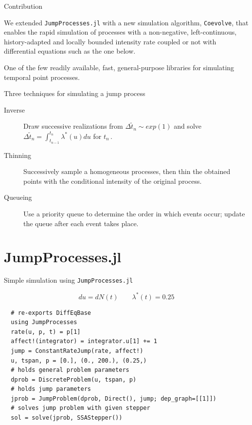 \documentclass[
  ignorenonframetext,
  aspectratio=169,
  xcolor={dvipsnames,rgb}
]{beamer}
\begin{document}
\begin{frame}{Contribution}


\vspace{-3em}

We extended \texttt{JumpProcesses.jl} with a new simulation algorithm, \texttt{Coevolve}, that enables the rapid simulation of processes with a non-negative, left-continuous, history-adapted and locally bounded intensity rate coupled or not with differential equations such as the one below.

\vspace{5em}

One of the few readily available, fast, general-purpose libraries for simulating temporal point processes.

\end{frame}

\begin{frame}{Three techniques for simulating a jump process}

\begin{description}

  \item[Inverse] Draw successive realizations from \( \Delta \tilde{t}_n \sim exp(1) \) and solve \( \Delta \tilde{t}_n = \int_{t_{n-1}}^{t_n} \lambda^\ast (u) du \) for \( t_n \, \).

  \item[Thinning] Successively sample a homogeneous processes, then thin the obtained points with the conditional intensity of the original process.

  \item[Queueing] Use a priority queue to determine the order in which events occur; update the queue after each event takes place.

\end{description}

\end{frame}

\hypertarget{jumpprocesses.jl}{\section{JumpProcesses.jl}\label{jumpprocesses.jl}}

\begin{frame}[fragile=singleslide]{Simple simulation using \texttt{JumpProcesses.jl}}

\[
  du = d N(t) \qquad \lambda^\ast (t) = 0.25
\]


\begin{lstlisting}
  # re-exports DiffEqBase
  using JumpProcesses
  rate(u, p, t) = p[1]
  affect!(integrator) = integrator.u[1] += 1
  jump = ConstantRateJump(rate, affect!)
  u, tspan, p = [0.], (0., 200.), (0.25,)
  # holds general problem parameters
  dprob = DiscreteProblem(u, tspan, p)
  # holds jump parameters
  jprob = JumpProblem(dprob, Direct(), jump; dep_graph=[[1]])
  # solves jump problem with given stepper
  sol = solve(jprob, SSAStepper())
\end{lstlisting}

\end{frame}
\end{document}

